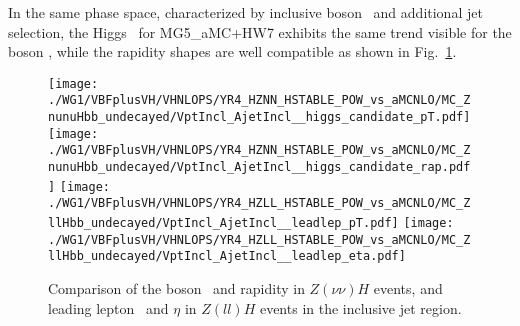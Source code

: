 In the same phase space, characterized by inclusive boson \pt\ and additional jet selection, the Higgs \pt\ for {\sc MG5\_aMC}+HW7 exhibits 
the same trend visible for the boson \pt, while the rapidity shapes are well compatible
as shown in Fig.~\ref{fig:stable__incl_hig}.
\begin{figure}[hptb]
\centering
\texttt{[image: ./WG1/VBFplusVH/VHNLOPS/YR4\_HZNN\_HSTABLE\_POW\_vs\_aMCNLO/MC\_ZnunuHbb\_undecayed/VptIncl\_AjetIncl\_\_higgs\_candidate\_pT.pdf]}
\texttt{[image: ./WG1/VBFplusVH/VHNLOPS/YR4\_HZNN\_HSTABLE\_POW\_vs\_aMCNLO/MC\_ZnunuHbb\_undecayed/VptIncl\_AjetIncl\_\_higgs\_candidate\_rap.pdf]}
\texttt{[image: ./WG1/VBFplusVH/VHNLOPS/YR4\_HZLL\_HSTABLE\_POW\_vs\_aMCNLO/MC\_ZllHbb\_undecayed/VptIncl\_AjetIncl\_\_leadlep\_pT.pdf]}
\texttt{[image: ./WG1/VBFplusVH/VHNLOPS/YR4\_HZLL\_HSTABLE\_POW\_vs\_aMCNLO/MC\_ZllHbb\_undecayed/VptIncl\_AjetIncl\_\_leadlep\_eta.pdf]}
\caption{Comparison of the boson \pt\ and rapidity in $Z(\nu\nu)H$ events, and leading lepton \pt\ and $\eta$ in $Z(ll)H$ events in the inclusive jet region.}
\label{fig:stable__incl_hig}
\end{figure}


